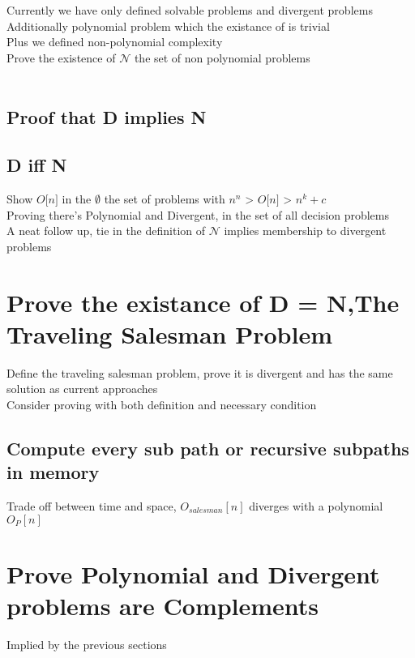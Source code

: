 \documentclass[11pt]{article}
\begin{document}
Currently we have only defined solvable problems and divergent problems\\
Additionally polynomial problem which the existance of is trivial\\
Plus we defined non-polynomial complexity\\
Prove the existence of $\mathcal{N}$ the set of non polynomial problems\\
\\

\subsection{Proof that D implies N}
\subsection{D iff N}

Show  $O \lbrack n \rbrack$ in the $\emptyset$ the set of problems with    $n^n$ > $O \lbrack n \rbrack$ > $n^k + c$\\
Proving there's Polynomial and Divergent, in the set of all decision problems\\


A neat follow up, tie in the definition of $\mathcal{N}$ implies membership to divergent problems


\newpage

\section{Prove the existance of D = N,The Traveling Salesman Problem}
Define the traveling salesman problem, prove it is divergent and has the same solution as current approaches\\
Consider proving with both definition and necessary condition\\

\subsection{Compute every sub path or recursive subpaths in memory}
Trade off between time and space, $O_{salesman}[n]$ diverges with a polynomial $O_P[n]$



\section{Prove Polynomial and Divergent problems are Complements}
Implied by the previous sections
\end{document}
